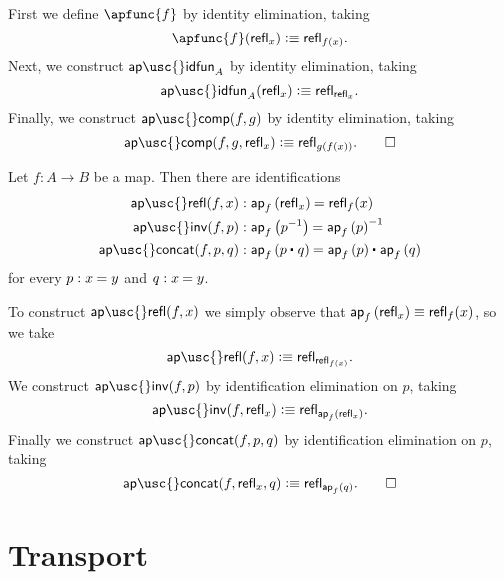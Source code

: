 \begin{constr}
First we define $\apfunc{f}$ by identity elimination, taking
\begin{equation*}
\apfunc{f}(\refl{x})\defeq \refl{f(x)}.
\end{equation*}
Next, we construct $\mathsf{ap\usc{}idfun}_A$ by identity elimination, taking
\begin{equation*}
\mathsf{ap\usc{}idfun}_A(\refl{x}) \defeq \refl{\refl{x}}.
\end{equation*}
Finally, we construct $\mathsf{ap\usc{}comp}(f,g)$ by identity elimination, taking
\begin{equation*}
\mathsf{ap\usc{}comp}(f,g,\refl{x}) \defeq \refl{g(f(x))}.\qedhere
\end{equation*}
\end{constr}

\begin{defn}
Let $f:A\to B$ be a map. Then there are identifications
\begin{align*}
\mathsf{ap\usc{}refl}(f,x) & : \id{\ap{f}{\refl{x}}}{\refl{f}(x)} \\
\mathsf{ap\usc{}inv}(f,p) & : \id{\ap{f}{p^{-1}}}{\ap{f}{p}^{-1}} \\
\mathsf{ap\usc{}concat}(f,p,q) & : \id{\ap{f}{\ct{p}{q}}}{\ct{\ap{f}{p}}{\ap{f}{q}}}
\end{align*}
for every $p:\id{x}{y}$ and $q:\id{x}{y}$.
\end{defn}

\begin{constr}
To construct $\mathsf{ap\usc{}refl}(f,x)$ we simply observe that ${\mathsf{ap}_{f}\left({\mathsf{refl}_{x}}\right)}\equiv {\mathsf{refl}_{f}(x)}$, so we take
\begin{equation*}
\mathsf{ap\usc{}refl}(f,x)\defeq\refl{\refl{f(x)}}.
\end{equation*}
We construct $\mathsf{ap\usc{}inv}(f,p)$ by identification elimination on $p$, taking
\begin{equation*}
\mathsf{ap\usc{}inv}(f,\refl{x}) \defeq \refl{\ap{f}{\refl{x}}}.
\end{equation*}
Finally we construct $\mathsf{ap\usc{}concat}(f,p,q)$ by identification elimination on $p$, taking
\begin{equation*}
\mathsf{ap\usc{}concat}(f,\refl{x},q)  \defeq \refl{\ap{f}{q}}.\qedhere
\end{equation*}
\end{constr}

\section{Transport}

